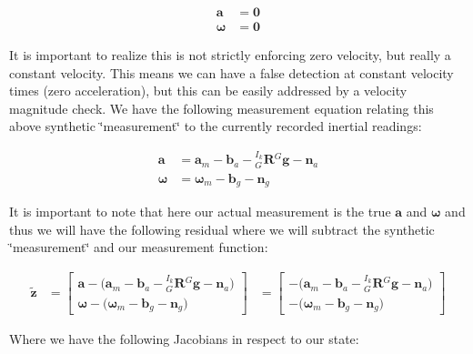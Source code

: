 \begin{align*} \mathbf{a} &= \mathbf{0} \\ \boldsymbol{\omega} &= \mathbf{0} \end{align*}

It is important to realize this is not strictly enforcing zero velocity, but really a constant velocity. This means we can have a false detection at constant velocity times (zero acceleration), but this can be easily addressed by a velocity magnitude check. We have the following measurement equation relating this above synthetic \char`\"{}measurement\char`\"{} to the currently recorded inertial readings\+:

\begin{align*} \mathbf{a} &= \mathbf{a}_m - \mathbf{b}_a - {}^{I_k}_G\mathbf{R}{}^G\mathbf{g} - \mathbf{n}_a \\ \boldsymbol{\omega} &= \boldsymbol{\omega}_m - \mathbf{b}_g - \mathbf{n}_g \end{align*}

It is important to note that here our actual measurement is the true $\mathbf{a}$ and $\boldsymbol{\omega}$ and thus we will have the following residual where we will subtract the synthetic \char`\"{}measurement\char`\"{} and our measurement function\+:

\begin{align*} \tilde{\mathbf{z}} &= \begin{bmatrix} \mathbf{a} - \Big(\mathbf{a}_m - \mathbf{b}_a - {}^{I_k}_G\mathbf{R}{}^G\mathbf{g} - \mathbf{n}_a \Big) \\ \boldsymbol{\omega} - \Big(\boldsymbol{\omega}_m - \mathbf{b}_g - \mathbf{n}_g \Big) \end{bmatrix} &= \begin{bmatrix} - \Big(\mathbf{a}_m - \mathbf{b}_a - {}^{I_k}_G\mathbf{R}{}^G\mathbf{g} - \mathbf{n}_a \Big) \\ - \Big(\boldsymbol{\omega}_m - \mathbf{b}_g - \mathbf{n}_g \Big) \end{bmatrix} \end{align*}

Where we have the following Jacobians in respect to our state\+:

